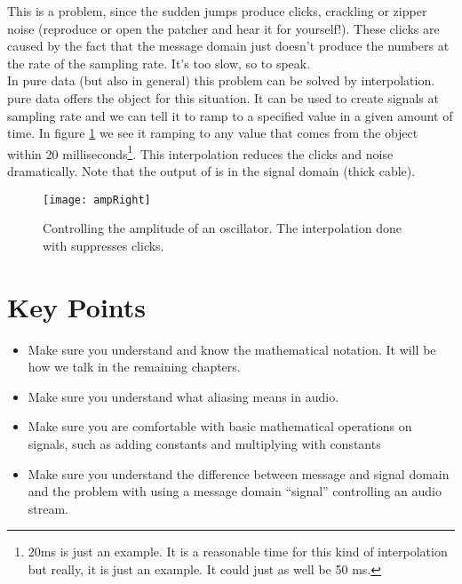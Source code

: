 This is a problem, since the sudden jumps produce clicks, crackling or zipper noise (reproduce or open the patcher and hear it for yourself!). These clicks are caused by the fact that the message domain just doesn't produce
the numbers at the rate of the sampling rate. It's too slow, so to speak.\\
In pure data (but also in general) this problem can be solved by interpolation. pure data offers the  object for this situation. It can be used to create signals at sampling rate and we can tell it to ramp to a specified value in a given amount of time. In figure \ref{fig:ampRight} we see it ramping to any value that comes from the  object within 20 milliseconds\footnote{20ms is just an example. It is a reasonable time for this kind of interpolation but really, it is just an example. It could just as well be 50 ms.}. This interpolation reduces the clicks and noise dramatically. Note that the output of  is in the signal domain (thick cable).

\begin{figure}[H]
	\centering
	\texttt{[image: ampRight]}
	\caption[shortCaption]
	{Controlling the amplitude of an oscillator. The interpolation done with  suppresses clicks. }
	\label{fig:ampRight}
\end{figure}


\section{Key Points}
\begin{itemize}
	\item Make sure you understand and know the mathematical notation. It will be how we talk in the remaining chapters.
	\item Make sure you understand what aliasing means in audio.
	\item Make sure you are comfortable with basic mathematical operations on signals, such as adding constants and multiplying with constants
	\item Make sure you understand the difference between message and signal domain and the problem with using a message domain ``signal'' controlling an audio stream. 
\end{itemize}
